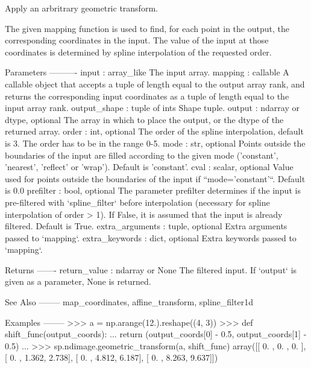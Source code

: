 \begin{DoxyVerb}Apply an arbritrary geometric transform.

The given mapping function is used to find, for each point in the
output, the corresponding coordinates in the input. The value of the
input at those coordinates is determined by spline interpolation of
the requested order.

Parameters
----------
input : array_like
    The input array.
mapping : callable
    A callable object that accepts a tuple of length equal to the output
    array rank, and returns the corresponding input coordinates as a tuple
    of length equal to the input array rank.
output_shape : tuple of ints
    Shape tuple.
output : ndarray or dtype, optional
    The array in which to place the output, or the dtype of the returned
    array.
order : int, optional
    The order of the spline interpolation, default is 3.
    The order has to be in the range 0-5.
mode : str, optional
    Points outside the boundaries of the input are filled according
    to the given mode ('constant', 'nearest', 'reflect' or 'wrap').
    Default is 'constant'.
cval : scalar, optional
    Value used for points outside the boundaries of the input if
    ``mode='constant'``. Default is 0.0
prefilter : bool, optional
    The parameter prefilter determines if the input is pre-filtered with
    `spline_filter` before interpolation (necessary for spline
    interpolation of order > 1).  If False, it is assumed that the input is
    already filtered. Default is True.
extra_arguments : tuple, optional
    Extra arguments passed to `mapping`.
extra_keywords : dict, optional
    Extra keywords passed to `mapping`.

Returns
-------
return_value : ndarray or None
    The filtered input. If `output` is given as a parameter, None is
    returned.

See Also
--------
map_coordinates, affine_transform, spline_filter1d

Examples
--------
>>> a = np.arange(12.).reshape((4, 3))
>>> def shift_func(output_coords):
...     return (output_coords[0] - 0.5, output_coords[1] - 0.5)
...
>>> sp.ndimage.geometric_transform(a, shift_func)
array([[ 0.   ,  0.   ,  0.   ],
       [ 0.   ,  1.362,  2.738],
       [ 0.   ,  4.812,  6.187],
       [ 0.   ,  8.263,  9.637]])\end{DoxyVerb}
 \hypertarget{namespacescipy_1_1ndimage_1_1interpolation_acc7e6b8904f3c4e9df3a4aa135f77e10}{}
